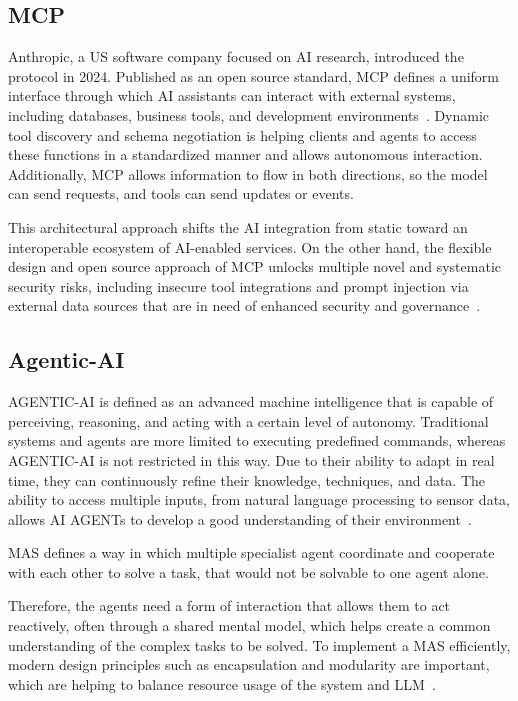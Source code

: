\subsection{\gls{MCP}}\label{subsec:mcp}

\gls{Anthropic}, a US software company focused on \gls{AI} research, introduced the protocol in 2024.
Published as an open source standard, \gls{MCP} defines a uniform interface through which \gls{AI} assistants can interact with external systems, including databases, business tools, and development environments~\cite{anthropic-mcp}.
Dynamic tool discovery and schema negotiation is helping clients and agents to access these functions in a standardized manner and allows autonomous interaction.
Additionally, \gls{MCP} allows information to flow in both directions, so the model can send requests, and tools can send updates or events.

This architectural approach shifts the \gls{AI} integration from static toward an interoperable ecosystem of \gls{AI}-enabled services.
On the other hand, the flexible design and open source approach of \gls{MCP} unlocks multiple novel and systematic security risks, including insecure tool integrations and prompt injection via external data sources that are in need of enhanced security and governance~\cite{hasan2025modelcontextprotocolmcp}.

\subsection{Agentic-AI}\label{subsec:agentic-ai}

\gls{AGENTIC-AI} is defined as an advanced machine intelligence that is capable of perceiving, reasoning, and acting with a certain level of autonomy.
Traditional systems and agents are more limited to executing predefined commands, whereas \gls{AGENTIC-AI} is not restricted in this way.
Due to their ability to adapt in real time, they can continuously refine their knowledge, techniques, and data.
The ability to access multiple inputs, from natural language processing to sensor data, allows \gls{AI AGENT}s to develop a good understanding of their environment~\cite{chapter1}.

\gls{MAS} defines a way in which multiple specialist agent coordinate and cooperate with each other to solve a task, that would not be solvable to one agent alone.

Therefore, the agents need a form of interaction that allows them to act reactively, often through a shared mental model, which helps create a common understanding of the complex tasks to be solved.
To implement a \gls{MAS} efficiently, modern design principles such as encapsulation and modularity are important, which are helping to balance resource usage of the system and \gls{LLM}~\cite{chapter3}.

